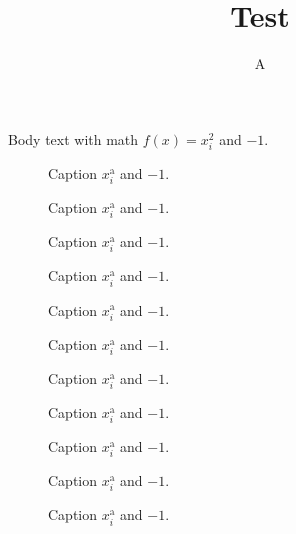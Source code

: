 \documentclass{article}
\title{Test}
\author{A}
\begin{document}
\maketitle

Body text with math $f(x) = x_{i}^{2}$ and $-1$.

\begin{figure}[htbp]
  \centering
  \caption{Caption $x_{i}^{\text{a}}$ and $-1$.}
\end{figure}
\clearpage

\begin{figure}[htbp]
  \centering
  \caption{Caption $x_{i}^{\text{a}}$ and $-1$.}
\end{figure}
\clearpage

\begin{figure}[htbp]
  \centering
  \caption{Caption $x_{i}^{\text{a}}$ and $-1$.}
\end{figure}
\clearpage

\begin{figure}[htbp]
  \centering
  \caption{Caption $x_{i}^{\text{a}}$ and $-1$.}
\end{figure}
\clearpage

\begin{figure}[htbp]
  \centering
  \caption{Caption $x_{i}^{\text{a}}$ and $-1$.}
\end{figure}
\clearpage

\begin{figure}[htbp]
  \centering
  \caption{Caption $x_{i}^{\text{a}}$ and $-1$.}
\end{figure}
\clearpage

\begin{figure}[htbp]
  \centering
  \caption{Caption $x_{i}^{\text{a}}$ and $-1$.}
\end{figure}
\clearpage

\begin{figure}[htbp]
  \centering
  \caption{Caption $x_{i}^{\text{a}}$ and $-1$.}
\end{figure}
\clearpage

\begin{figure}[htbp]
  \centering
  \caption{Caption $x_{i}^{\text{a}}$ and $-1$.}
\end{figure}
\clearpage

\begin{figure}[htbp]
  \centering
  \caption{Caption $x_{i}^{\text{a}}$ and $-1$.}
\end{figure}
\clearpage

\begin{figure}[htbp]
  \centering
  \caption{Caption $x_{i}^{\text{a}}$ and $-1$.}
\end{figure}
\clearpage
\end{document}
